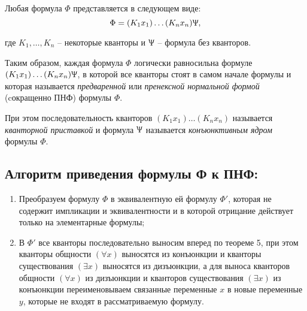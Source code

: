 \begin{definition}
    Любая формула $\Phi$ представляется в следующем виде:
    $$\Phi = (K_1 x_1)\ldots(K_n x_n)\Uppsi,$$
    
    где $K_1,\ldots,K_n$ -- некоторые кванторы и $\Uppsi$ -- формула без кванторов.

    Таким образом, каждая формула $\Phi$ логически равносильна формуле $(K_1 x_1)\ldots(K_n x_n)\Uppsi$, в которой все кванторы стоят в самом начале формулы и которая называется \textit{предваренной} или \textit{пренексной нормальной формой} (cокращенно ПНФ) формулы $\Phi$.

    При этом последовательность кванторов $(K_1 x_1)\ldots(K_n x_n)$ называется \textit{кванторной приставкой} и формула $\Uppsi$ называется \textit{конъюнктивным ядром} формулы $\Phi$.
\end{definition}

\subsection*{Алгоритм приведения формулы Ф к ПНФ:}
\begin{enumerate}
    \item Преобразуем формулу $\Phi$ в эквивалентную ей 
    формулу $\Phi'$, которая не содержит импликации и 
    эквивалентности и в которой отрицание 
    действует только на элементарные формулы;

    \item В $\Phi'$ все кванторы последовательно выносим 
    вперед по теореме 5, при этом кванторы 
    общности $(\forall x)$ выносятся из конъюнкции и 
    кванторы существования $(\exists x)$ выносятся из 
    дизъюнкции, а для выноса кванторов общности 
    $(\forall x)$ из дизъюнкции и кванторов существования 
    $(\exists x)$ из конъюнкции переименовываем связанные 
    переменные $x$ в новые переменные $y$, которые не 
    входят в рассматриваемую формулу.
    
\end{enumerate}